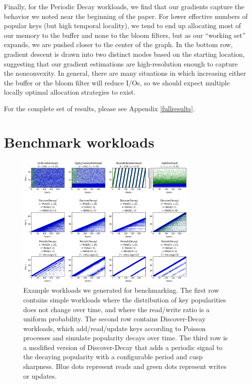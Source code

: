 \documentclass{cidr-2019}
\begin{document}
Finally, for the Periodic Decay workloads, we find that our gradients
capture the behavior we noted near the beginning of the paper. For lower
effective numbers of popular keys (but high temporal locality), we tend
to end up allocating most of our memory to the buffer and none to the bloom
filters, but as our ``working set'' expands, we are pushed closer to the center
of the graph. In the bottom row, gradient descent is drawn into two distinct
modes based on the starting location, suggesting that our gradient estimations
are high-resolution enough to capture the nonconvexity. In general, there are
many situations in which increasing either the buffer or the bloom filter will
reduce I/Os, so we should expect multiple locally optimal allocation strategies
to exist.

For the complete set of results, please see Appendix \ref{fullresults}.

\clearpage


\clearpage

\appendix

\section{Benchmark workloads} \label{workloads}

\begin{figure}[!h]
\centering
\includegraphics[width=0.80\textwidth]{workloads.png}
\caption{Example workloads we generated for benchmarking. The first row
  contains simple workloads where the distribution of key popularities does not
  change over time, and where the read/write ratio is a uniform probability.
  The second row contains Discover-Decay workloads, which add/read/update keys
  according to Poisson processes and simulate popularity decays over time. The
  third row is a modified version of Discover-Decay that adds a periodic signal
  to the decaying popularity with a configurable period and cusp sharpness. Blue
  dots represent reads and green dots represent writes or updates.}
\label{fig:workloads}
\end{figure}
\end{document}
